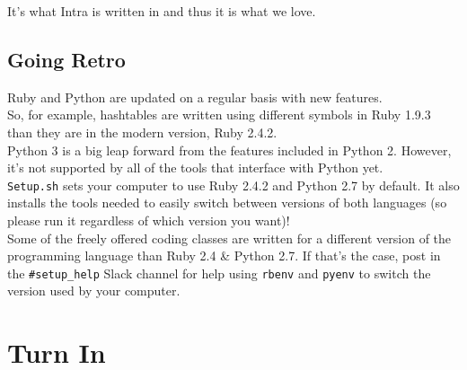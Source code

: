 \documentclass{42-en}
\begin{document}
It's what Intra is written in and thus it is what we love.\\


\section{Going Retro}

Ruby and Python are updated on a regular basis with new features.\\

So, for example, hashtables are written using different symbols in Ruby 1.9.3 than they are in the modern version, Ruby 2.4.2.\\

Python 3 is a big leap forward from the features included in Python 2. However, it's not supported by all of the tools that interface with Python yet.\\

\texttt{Setup.sh} sets your computer to use Ruby 2.4.2 and Python 2.7 by default. It also installs the tools needed to easily switch between versions of both languages (so please run it regardless of which version you want)!\\

Some of the freely offered coding classes are written for a different version of the programming language than Ruby 2.4 \& Python 2.7. If that's the case, post in the \texttt{\#setup\_help} Slack channel for help using \texttt{rbenv} and \texttt{pyenv} to switch the version used by your computer.



\chapter{Turn In}
\end{document}
